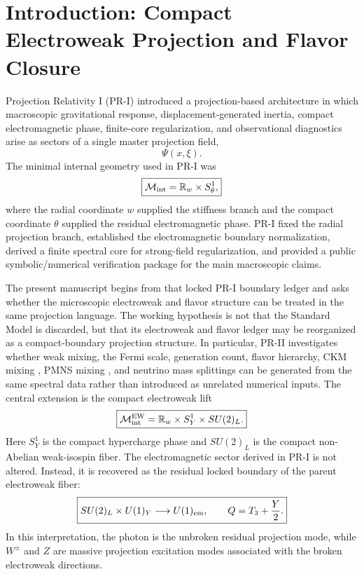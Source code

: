 \documentclass[11pt]{article}
\begin{document}
\section{Introduction: Compact Electroweak Projection and Flavor Closure}
\label{sec:introduction}

Projection Relativity I (PR-I) \cite{OshetskiPRGitHub2026} introduced a projection-based architecture in which macroscopic gravitational response, displacement-generated inertia, compact electromagnetic phase, finite-core regularization, and observational diagnostics arise as sectors of a single master projection field,
\begin{equation}
\boxed{
\Psi(x,\xi).
}
\end{equation}
The minimal internal geometry used in PR-I was
\begin{equation}
\boxed{
\mathcal M_{\rm int}
=
\mathbb R_w
\times
S^1_\theta,
}
\end{equation}
where the radial coordinate \(w\) supplied the stiffness branch and the compact coordinate \(\theta\) supplied the residual electromagnetic phase. PR-I fixed the radial projection branch, established the electromagnetic boundary normalization, derived a finite spectral core for strong-field regularization, and provided a public symbolic/numerical verification package for the main macroscopic claims.

The present manuscript begins from that locked PR-I boundary ledger and asks whether the microscopic electroweak and flavor structure can be treated in the same projection language. The working hypothesis is not that the Standard Model \cite{Glashow1961, Weinberg1967, Salam1968} is discarded, but that its electroweak and flavor ledger may be reorganized as a compact-boundary projection structure. In particular, PR-II investigates whether weak mixing, the Fermi scale, generation count, flavor hierarchy, CKM mixing \cite{MakiNakagawaSakata1962}, PMNS mixing \cite{BellJackiw1969}, and neutrino mass splittings can be generated from the same spectral data rather than introduced as unrelated numerical inputs. The central extension is the compact electroweak lift
\begin{equation}
\boxed{
\mathcal M_{\rm int}^{\rm EW}
=
\mathbb R_w
\times
S_Y^1
\times
SU(2)_L.
}
\end{equation}
Here \(S_Y^1\) is the compact hypercharge phase and \(SU(2)_L\) is the compact non-Abelian weak-isospin fiber. The electromagnetic sector derived in PR-I is not altered. Instead, it is recovered as the residual locked boundary of the parent electroweak fiber:
\begin{equation}
\boxed{
SU(2)_L\times U(1)_Y
\longrightarrow
U(1)_{\rm em},
\qquad
Q
=
T_3+\frac{Y}{2}.
}
\end{equation}
In this interpretation, the photon is the unbroken residual projection mode, while \(W^\pm\) and \(Z\) are massive projection excitation modes associated with the broken electroweak directions.
\end{document}
